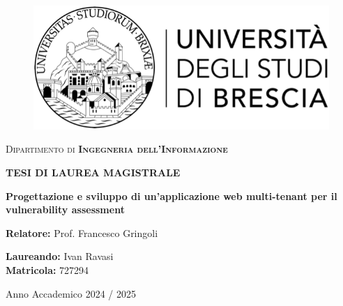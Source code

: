 \begin{titlepage}
    \begin{center}
        \vspace{4cm}
        \begin{figure}[!h]
            \centering
            \includegraphics{img/unibs.png}
        \end{figure}
        {\Large{\textsc{Dipartimento di \textbf{Ingegneria dell'Informazione}}}\par}
        \vspace{2mm}
        {\large {}\par}
    \end{center}

    \vspace{35mm}
 
    \begin{center}
        {\huge {\bf TESI DI LAUREA MAGISTRALE}\par}
        \vspace{5mm}
        {\LARGE \bfseries Progettazione e sviluppo di un'applicazione web multi-tenant per il vulnerability assessment}
    \end{center}
 
    \vspace{40mm}

    \noindent
        {\large{\bf Relatore:} Prof. Francesco Gringoli} \\
        \vspace{5mm}
        \begin{flushright}
            {\large{\bf Laureando:} Ivan Ravasi} \\
            \vspace{2mm}
            {\large{\bf Matricola:} 727294}
        \end{flushright}
    \hfill
    \newline
    \vspace{5mm}
 
    \vfill
    \begin{center}
        {\large Anno Accademico 2024 / 2025}
    \end{center}
\end{titlepage}
\restoregeometry